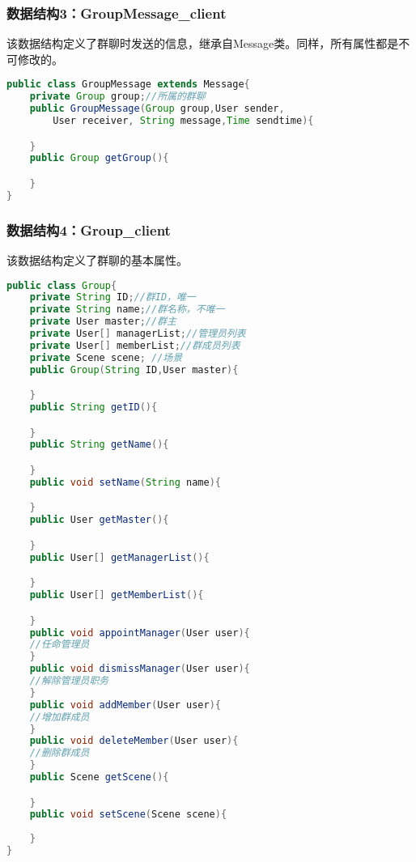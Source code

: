 \subsubsection{数据结构3：GroupMessage\_client}
该数据结构定义了群聊时发送的信息，继承自Message类。同样，所有属性都是不可修改的。
\begin{lstlisting}[language=Java, caption=GroupMessage定义]
public class GroupMessage extends Message{
    private Group group;//所属的群聊
    public GroupMessage(Group group,User sender,
        User receiver, String message,Time sendtime){

    }
    public Group getGroup(){

    }
}
\end{lstlisting}

\subsubsection{数据结构4：Group\_client}
该数据结构定义了群聊的基本属性。
\begin{lstlisting}[language=Java, caption=Group定义]
public class Group{
    private String ID;//群ID，唯一
    private String name;//群名称，不唯一
    private User master;//群主
    private User[] managerList;//管理员列表
    private User[] memberList;//群成员列表
    private Scene scene; //场景
    public Group(String ID,User master){

    }
    public String getID(){

    }
    public String getName(){

    }
    public void setName(String name){

    }
    public User getMaster(){

    }
    public User[] getManagerList(){

    }
    public User[] getMemberList(){

    }
    public void appointManager(User user){
    //任命管理员
    }
    public void dismissManager(User user){
    //解除管理员职务
    }
    public void addMember(User user){
    //增加群成员
    }
    public void deleteMember(User user){
    //删除群成员
    }
    public Scene getScene(){

    }
    public void setScene(Scene scene){
        
    }
}
\end{lstlisting}

